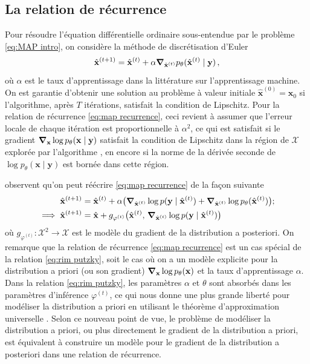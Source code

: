 \subsection{La relation de récurrence}
Pour résoudre l'équation différentielle ordinaire sous-entendue par le problème \eqref{eq:MAP intro}, 
on considère la méthode de discrétisation d'Euler 
\begin{equation}\label{eq:map recurrence}
        \hat{\mathbf{x}}^{(t+1)} = \hat{\mathbf{x}}^{(t)} + \alpha \grad_{\hat{\mathbf{x}}^{(t)}} p_\theta(\hat{\mathbf{x}}^{(t)} \mid \mathbf{y})\, ,
\end{equation} 
où $\alpha$ est le taux d'apprentissage dans la littérature sur 
l'apprentissage machine.
On est garantie d'obtenir une solution 
au problème à valeur initiale $\hat{\mathbf{x}}^{(0)} = \mathbf{x}_0$ si l'algorithme, après $T$ itérations, 
satisfait la condition de Lipschitz. Pour la relation de récurrence \eqref{eq:map recurrence}, ceci revient 
à assumer que l'erreur locale de chaque itération est proportionnelle à $\alpha^{2}$, ce qui est 
satisfait si le gradient $\grad_{\mathbf{x}}\log p_\theta(\mathbf{x} \mid \mathbf{y})$ 
satisfait la condition de Lipschitz dans la région de $\mathcal{X}$ explorée par l'algorithme \citep{Atkinson1989,Butcher2016}, 
en encore si la norme de la dérivée seconde de $\log p_\theta(\mathbf{x} \mid \mathbf{y})$ est bornée dans cette région.

\citet{Putzky2017} observent qu'on peut réécrire \eqref{eq:map recurrence} de la façon suivante
\begin{align}
        \hat{\mathbf{x}}^{(t+1)} &= 
        \hat{\mathbf{x}}^{(t)} + \alpha \big( \grad_{\hat{\mathbf{x}}^{(t)}}\log p(\mathbf{y} \mid \hat{\mathbf{x}}^{(t)}) 
        +  \grad_{\hat{\mathbf{x}}^{(t)}}\log p_\theta(\hat{\mathbf{x}}^{(t)})\big);\\
        \label{eq:rim putzky}
        \implies \hat{\mathbf{x}}^{(t+1)} &= \hat{\mathbf{x}} + g_{\varphi^{(t)}}\big(\hat{\mathbf{x}}^{(t)},\, \grad_{\hat{\mathbf{x}}^{(t)}} \log p(\mathbf{y} \mid \hat{\mathbf{x}}^{(t)})\big)
\end{align}
où $g_{\varphi^{(t)}}: \mathcal{X}^{2} \rightarrow \mathcal{X}$ est le modèle du gradient de la distribution 
a posteriori. 
On remarque que la relation de récurrence \eqref{eq:map recurrence} est un cas spécial de la relation \eqref{eq:rim putzky}, 
soit le cas où on a un modèle explicite pour la distribution a priori (ou son gradient) $\grad_{\mathbf{x}} \log p_\theta(\mathbf{x})$ 
et la taux d'apprentissage $\alpha$. 
Dans la relation \eqref{eq:rim putzky}, les paramètres $\alpha$ et $\theta$ sont absorbés dans les paramètres d'inférence $\varphi^{(t)}$, ce qui nous donne 
une plus grande liberté pour modéliser la distribution a priori en utilisant le théorème d'approximation universelle \citep{Cybenko1989,Hornik1991}. 
Selon ce nouveau point de vue, 
le problème de modéliser la distribution a priori, ou plus directement le gradient de la distribution a priori, 
est équivalent à construire un modèle pour le gradient de la distribution a posteriori dans une relation 
de récurrence.

